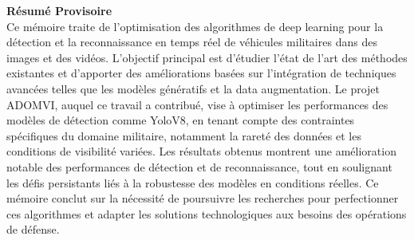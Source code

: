 \sloppy

\textbf{Résumé Provisoire}\\

Ce mémoire traite de l'optimisation des algorithmes de deep learning pour la détection et la reconnaissance en temps réel de véhicules militaires dans des images et des vidéos.
L'objectif principal est d'étudier l'état de l'art des méthodes existantes et d'apporter des améliorations basées sur l'intégration de techniques avancées telles que les modèles génératifs et la data augmentation.
Le projet ADOMVI, auquel ce travail a contribué, vise à optimiser les performances des modèles de détection comme YoloV8, en tenant compte des contraintes spécifiques du domaine militaire, notamment la rareté des données et les conditions de visibilité variées.
Les résultats obtenus montrent une amélioration notable des performances de détection et de reconnaissance, tout en soulignant les défis persistants liés à la robustesse des modèles en conditions réelles.
Ce mémoire conclut sur la nécessité de poursuivre les recherches pour perfectionner ces algorithmes et adapter les solutions technologiques aux besoins des opérations de défense.

